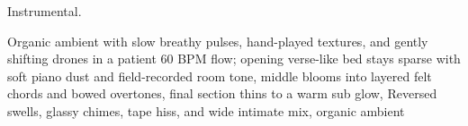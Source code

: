 
\label{sec:claim-ledger-drift}
\begin{notes}
Instrumental.
\end{notes}
\begin{prompt}
Organic ambient with slow breathy pulses, hand-played textures, and gently shifting drones in a patient 60 BPM flow; opening verse-like bed stays sparse with soft piano dust and field-recorded room tone, middle blooms into layered felt chords and bowed overtones, final section thins to a warm sub glow, Reversed swells, glassy chimes, tape hiss, and wide intimate mix, organic ambient
\end{prompt}

